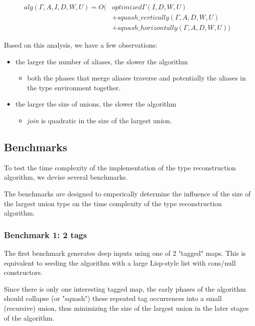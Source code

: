 \begin{align*}
alg(\Gamma,A,I,D,W,U) = O(&optimized\Gamma(I, D, W, U) \\
												  &+ squash\_vertically(\Gamma, A, D, W, U)\\
													&+ squash\_horizontally(\Gamma, A, D, W, U))
\end{align*}

Based on this analysis, we have a few observations:

\begin{itemize}
\item the larger the number of aliases, the slower the algorithm
	\begin{itemize}
		\item both the phases that merge aliases traverse and potentially
					the aliases in the type environment together.
	\end{itemize}
\item the larger the size of unions, the slower the algorithm
	\begin{itemize}
		\item \emph{join} is quadratic in the size of the largest union.
	\end{itemize}
\end{itemize}

\subsection{Benchmarks}

To test the time complexity of the implementation of the type reconstruction
algorithm, we devise several benchmarks.

The benchmarks are designed to emperically determine the influence of the
size of the largest union type on the time complexity of the type reconstruction
algorithm.

\subsubsection{Benchmark 1: 2 tags}

The first benchmark generates deep inputs using one of 2 "tagged" maps.
This is equivalent to seeding the algorithm with
a large Lisp-style list with cons/null constructors.

Since there is only one interesting tagged map, the early phases of the
algorithm should collapse (or "squash") these repeated tag occurrences
into a small (recursive) union, thus minimizing the size of the largest
union in the later stages of the algorithm.

